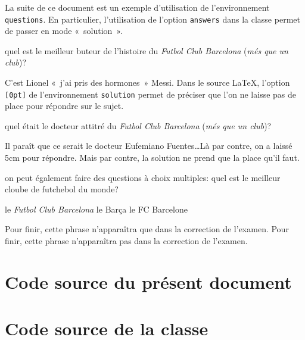 \documentclass[addpoints,fr,biblatex,name,gradetable]{isae-exam}
\begin{document}
La suite de ce document est un exemple d'utilisation de
l'environnement \lstinline!questions!. En particulier, l'utilisation
de l'option \lstinline!answers! dans la classe permet de passer en
mode «~solution~».

\begin{questions}
\question[1] quel est le meilleur buteur de l'histoire du \textit{Futbol
  Club Barcelona} (\textit{més que un club})?

\begin{solution}[0pt]

  C'est Lionel «~j'ai pris des hormones~» Messi. Dans le source
  \LaTeX, l'option \lstinline![0pt]! de l'environnement
  \lstinline!solution! permet de préciser que l'on ne laisse pas de
  place pour répondre sur le sujet.
\end{solution}

\question[1\half] quel était le docteur attitré du \textit{Futbol
  Club Barcelona} (\textit{més que un club})?

\begin{solution}[5cm]

  Il paraît que ce serait le docteur Eufemiano Fuentes\ldots Là par
  contre, on a laissé 5cm pour répondre. Mais par contre, la
  solution ne prend que la place qu'il faut.
\end{solution}

\question[\half] on peut également faire des questions à choix multiples:
quel est le meilleur cloube de futchebol du monde?

\begin{checkboxes}
  \CorrectChoice le \textit{Futbol Club Barcelona}
  \choice le Barça
  \choice le FC Barcelone
\end{checkboxes}
\end{questions}

\ifprintanswers
  Pour finir, cette phrase n'apparaîtra que dans la correction de l'examen.
\else
  Pour finir, cette phrase n'apparaîtra pas dans la correction de l'examen.
\fi

\section{Code source du présent document}
\label{sec:code-source-doc}



\section{Code source de la classe}
\label{sec:code-source-classe}



\printbibliography
\end{document}
